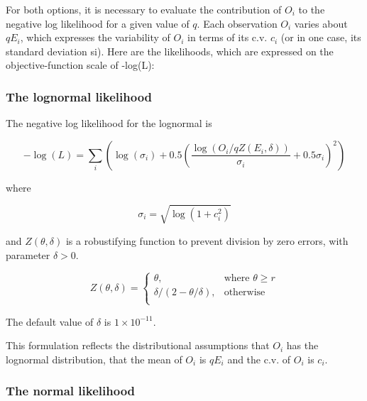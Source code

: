 For both options, it is necessary to evaluate the contribution of $O_i$ to the negative log likelihood for a given value of $q$. Each observation $O_i$ varies about $qE_i$, which expresses the variability of $O_i$ in terms of its c.v. $c_i$ (or in one case, its standard deviation si). Here are the likelihoods, which are expressed on the objective-function scale of -log(L):

\subsubsection*{The lognormal likelihood}

The negative log likelihood for the lognormal is

\begin{equation}
- \log \left(L \right) = \sum\limits_i \left( \log \left( \sigma _i \right) + 0.5\left( \frac{\log \left(O_i / q Z \left(E_i,\delta \right) \right)}{\sigma_i} + 0.5 \sigma_i \right)^2 \right)
\end{equation}

where

\begin{equation}
\sigma_i  = \sqrt{\log \left(1+c_i^2 \right)}
\end{equation}

and $Z \left(\theta,\delta \right)$ is a robustifying function to prevent division by zero errors, with parameter $\delta>0$.

\begin{equation}
Z \left(\theta,\delta \right) = \begin{cases}
\theta, & \text{where $\theta \ge r$} \\
\delta/\left( 2-\theta/\delta \right), & \text{otherwise} \\
\end{cases}
\end{equation}

The default value of $\delta$ is $1 \times 10^{-11}$.

This formulation reflects the distributional assumptions that  $O_i$ has the lognormal distribution, that the mean of $O_i$ is $qE_i$  and the c.v. of $O_i$ is $c_i$.

\subsubsection*{The normal likelihood}

